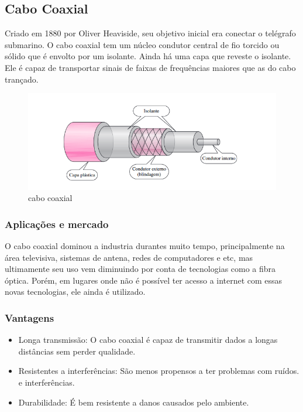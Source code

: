 \documentclass[12pt,a4, oneside, brazil]{article}
\begin{document}
		\subsection{Cabo Coaxial}
	Criado em 1880 por Oliver Heaviside, seu objetivo inicial era conectar o telégrafo submarino. O cabo coaxial tem um núcleo condutor central de fio torcido ou sólido que é envolto por um isolante. Ainda há uma capa que reveste o isolante. Ele é capaz de transportar sinais de faixas de frequências maiores que as do cabo trançado.

	
	\begin{figure}[H]
		\centering
		\includegraphics[width=15cm]{coaxial}
		\caption{cabo coaxial}
		\label{fig:coaxial}
	\end{figure}
	
	
	\subsubsection{Aplicações e mercado}
	O cabo coaxial dominou a industria durantes muito tempo, principalmente na área televisiva, sistemas de antena, redes de computadores e etc, mas ultimamente seu uso vem diminuindo por conta de tecnologias como a fibra óptica. Porém, em lugares onde não é possível ter acesso a internet com essas novas tecnologias, ele ainda é utilizado.
	
	\subsubsection{Vantagens}
	\begin{itemize}
		\item Longa transmissão: O cabo coaxial é capaz de transmitir dados a longas distâncias sem perder qualidade.
		\item Resistentes a interferências: São menos propensos a ter problemas com ruídos. e interferências.
		\item Durabilidade: É bem resistente a danos causados pelo ambiente.
	\end{itemize}
\end{document}

